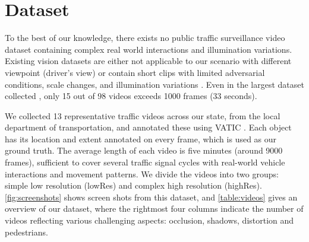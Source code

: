 \section{Dataset}
To the best of our knowledge, there exists no public traffic surveillance video dataset containing complex real world interactions and illumination variations. 
Existing vision datasets are either not applicable to our scenario with different viewpoint (driver's view) \cite{sivaraman2010general} 
or contain short clips with limited adversarial conditions, scale changes, and illumination variations \cite{manen2014appearances,wu2015object}. %
Even in the largest dataset collected \cite{wu2015object}, only 15 out of 98 videos exceeds 1000 frames (33 seconds).%

We collected 13 representative traffic videos across our state, from the local department of transportation, and annotated these using VATIC \cite{springerlink:10.1007/s11263-012-0564-1}. Each object has its location and extent annotated on every frame, which is used as our ground truth. The average length of each video is five minutes (around 9000 frames), sufficient to cover several traffic signal cycles with real-world vehicle interactions and movement patterns. We divide the videos into two groups: simple low resolution (lowRes) and complex high resolution (highRes). \ref{fig:screenshots} shows screen shots from this dataset, and \ref{table:videos} gives an overview of our dataset, where the rightmost four columns indicate the number of videos reflecting various challenging aspects: occlusion, shadows, distortion and pedestrians.

